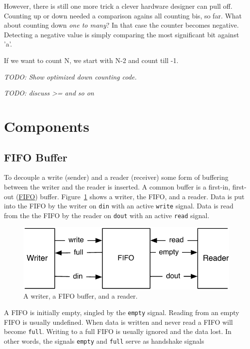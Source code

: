 \documentclass[a4paper]{article}
\newcommand{\code}[1]{{\small{\texttt{#1}}}}
\newcommand{\todo}[1]{{\emph{TODO: #1}}}
\begin{document}
However, there is still one more trick a clever hardware designer can pull off.
Counting up or down needed a comparison agains all counting bis, so far.
What about counting down \emph{one to many}? In that case the counter
becomes negative. Detecting a negative value is simply comparing the
most significant bit against 'a'.

If we want to count N, we start with N-2 and count till -1.

\todo{Show optimized down counting code.}


\todo{discuss >= and so on}

\section{Components}

\subsection{FIFO Buffer}

To decouple a write (sender) and a reader (receiver) some form
of buffering between the writer and the reader is inserted.
A common buffer is a first-in, first-out
(\href{https://en.wikipedia.org/wiki/FIFO_%28computing_and_electronics%29}{FIFO})
buffer. Figure~\ref{fig:fifo} shows a writer, the FIFO, and a reader.
Data is put into the FIFO by the writer on \code{din} with an active
\code{write} signal. Data is read from the the FIFO by the reader on
\code{dout} with an active \code{read} signal.

\begin{figure}
  \centering
  \includegraphics{figures/fifo}

  \caption{A writer, a FIFO buffer, and a reader.}
  \label{fig:fifo}
\end{figure}

A FIFO is initially empty, singled by the \code{empty} signal. Reading
from an empty FIFO is usually undefined. When data is written and never
read a FIFO will become \code{full}. Writing to a full FIFO is usually ignored
and the data lost. In other words, the signals \code{empty} and \code{full}
serve as handshake signals 
\end{document}

